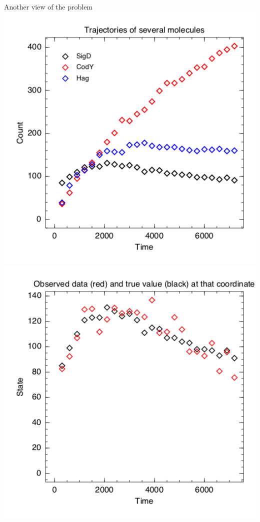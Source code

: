 \documentclass[12pt,a4paper,t,xcolor=dvipsnames,slidestop,compress,mathserif]{beamer}
\begin{document}
\begin{frame}{Another view of the problem}
\includegraphics[scale=0.30]{simulated_data_multiple_mols.png}
\includegraphics[scale=0.30]{simulated_data_obs.png}
\end{frame}
\end{document}
